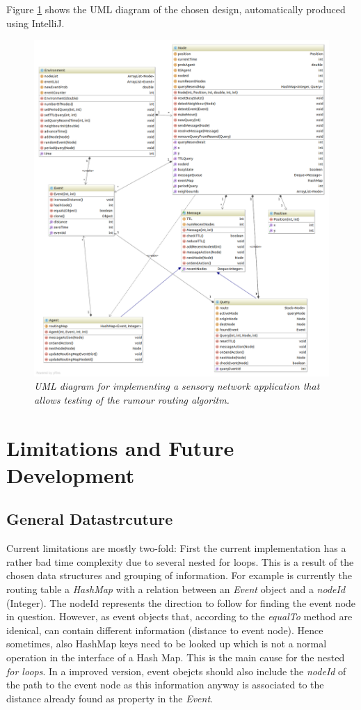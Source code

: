 \documentclass[a4paper,11pt,twoside]{article}
\begin{document}
Figure \ref{fig:uml} shows the UML diagram of the chosen design,
automatically produced using IntelliJ.
\begin{figure}
\centering
\includegraphics[width=\textwidth]{uml.png}
\caption{\textit{UML diagram for implementing a sensory network application
  that allows testing of the rumour routing algoritm.}}
\label{fig:uml}
\end{figure}



\section{Limitations and Future Development}
\subsection{General Datastrcuture}
Current limitations are mostly two-fold: First the current
implementation has a rather bad time complexity due to several nested
for loops. This is a result of the chosen data structures and grouping
of information. For example is currently the routing table a \textit{HashMap}
with a relation between an \textit{Event} object and a \textit{nodeId}
(Integer). The nodeId represents the direction to follow for finding
the event node in question. However, as event objects that, according
to the \textit{equalTo} method are idenical, can contain different information
(distance to event node). Hence sometimes, also HashMap keys need to
be looked up which is not a normal operation in the interface of a
Hash Map. This is the main cause for the nested \textit{for loops}. In a
improved version, event obejcts should also include the \textit{nodeId} of the
path to the event node as this information anyway is associated to the
distance already found as property in the \textit{Event}. 
\end{document}
